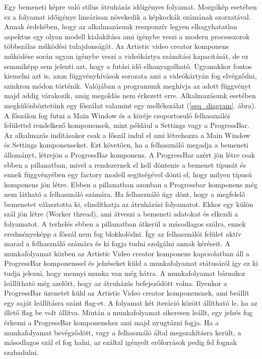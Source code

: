\documentclass[12pt, a4paper, oneside]{book}
\theoremstyle{tetel}
\begin{document}
Egy bemeneti képre való stílus átruházás időigényes folyamat. Mozgókép esetében ez a folyamat időigénye lineárisan növekedik a képkockák számának szorzatával. Annak érdekében, hogy az alkalmazásunk reszponzív legyen elhagyhatatlan aspektus egy olyan modell kialakítása ami igénybe veszi a modern processzorok többszálas működési tulajdonságát. Az Artistic video creator komponens működése során ugyan igénybe veszi a videókártya számítási kapacitását, de ez semmiképp sem jelenti azt, hogy a futási idő elhanyagolható. Ugyanakkor fontos kiemelni azt is, azon függvényhívások sorozata ami a videókártyán fog elvégződni, szinkron módon történik. Valójában a programunk meghívja az adott függvényt majd addig várakozik, amig megoldás nem érkezett erre.
\newline
\indent
Alkalmazásunk esetében megkülönböztetünk egy főszálat valamint egy mellékszálat (\ref{seq_diagram}. ábra). A főszálon fog futni a Main Window és a köréje csoportosuló felhasználói felülettel rendelkező komponensek, mint például a Settings vagy a ProgressBar. Az alkalmazás indításakor csak a főszál indul el ami létrehozza a Main Window és Settings komponenseket. Ezt követően, ha a felhasználó megadja a bemeneti állományt, létrejön a ProgressBar komponens. A ProgressBar azért jön létre csak ebben a pillanatban, mivel a rendszernek el kell döntenie a bemenet típusát és ennek függvényében egy factory modell segítségével dönti el, hogy milyen típusú komponens jön létre. Ebben a pillanatban azonban a Progressbar komponens még nem látható a felhasználó számára.
\newline
\indent
Ha felhasználó úgy dönt, hogy a megfelelő bemenetet választotta ki, elindíthatja az átruházási folyamatot. Ekkor egy külön szál jön létre (Worker thread), ami átveszi a bemeneti adatokat és elkezdi a folyamatot. A terhelés ebben a pillanatban átkerül a másodlagos szálra, ennek eredményeképp a főszál nem fog blokkolódni. Így az felhasználói felület aktív marad a felhasználó számára és ki fogja tudni szolgálni annak kéréseit.
A munkafolyamat közben az Artistic Video creator komponens kapcsolatban áll a ProgressBar komponenssel és jelzéseket küld a munkafolyamat státusáról így ez ki tudja jelezni, hogy mennyi munka van még hátra. A munkafolyamat bármikor leállítható még azelőtt, hogy az átruházás befejeződött volna. Ilyenkor a ProgressBar üzenetet küld az Artistic Video creator komponensnek, ami beállít egy saját leállításra szánt flag-et. A folyamat két iteráció között állítható le, ha az illető flag be volt állítva. Miután a munkafolyamat sikeresen leállt, egy jelzés fog érkezni a ProgressBar komponenshez ami majd nyugtázni fogja. Ha a munkafolyamat bevégződött, vagy a felhasználó által megszakításra került, a másodlagos szál el fog halni, az ezáltal igényelt erőforrások pedig fel fognak szabadulni.
\end{document}
